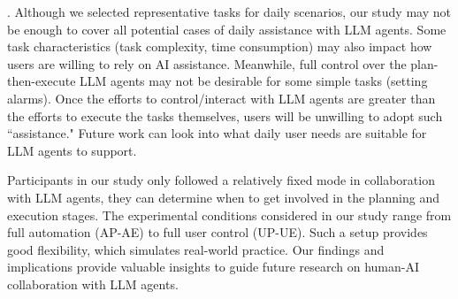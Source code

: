 . Although we selected representative tasks for daily scenarios, our study may not be enough to cover all potential cases of daily assistance with LLM agents. 
Some task characteristics (\eg task complexity, time consumption) may also impact how users are willing to rely on AI assistance. 
Meanwhile, full control over the plan-then-execute LLM agents may not be desirable for some simple tasks (\eg setting alarms). 
Once the efforts to control/interact with LLM agents are greater than the efforts to execute the tasks themselves, users will be unwilling to adopt such ``assistance." 
Future work can look into what daily user needs are suitable for LLM agents to support. 

Participants in our study only followed a relatively fixed mode in collaboration with LLM agents, they can determine when to get involved in the planning and execution stages. 
The experimental conditions considered in our study range from full automation (\ie AP-AE) to full user control (\ie UP-UE). 
Such a setup provides good flexibility, which simulates real-world practice. 
Our findings and implications provide valuable insights to guide future research on human-AI collaboration with LLM agents.

